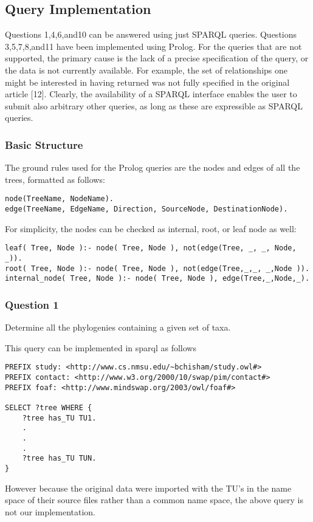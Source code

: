 \documentclass[10pt]{article}
\begin{document}
\subsection{Query Implementation}
Questions 1,4,6,and10 can be answered using just SPARQL queries.  Questions
3,5,7,8,and11 have been implemented using Prolog.   For the queries that are
not supported, the primary cause is the lack of a precise specification of the
query, or the data is not currently available. For example, the set of
relationships one might be interested in having returned was not fully
specified in the original article [12].  Clearly, the availability of a SPARQL
interface enables the user to submit also arbitrary other queries, as long as
these are expressible as SPARQL queries.
\subsubsection{Basic Structure}

The ground rules used for the Prolog queries are the nodes and edges of all the trees, formatted as follows:
\begin{verbatim}
node(TreeName, NodeName).
edge(TreeName, EdgeName, Direction, SourceNode, DestinationNode).
\end{verbatim}

For simplicity, the nodes can be checked as internal, root, or leaf node as well:
\begin{verbatim}
leaf( Tree, Node ):- node( Tree, Node ), not(edge(Tree, _, _, Node, _)).
root( Tree, Node ):- node( Tree, Node ), not(edge(Tree,_,_, _,Node )).
internal_node( Tree, Node ):- node( Tree, Node ), edge(Tree,_,Node,_).
\end{verbatim}

\subsubsection{Question 1}
 Determine all the phylogenies containing a given set of taxa.

This query can be implemented in sparql as follows
\begin{verbatim}
PREFIX study: <http://www.cs.nmsu.edu/~bchisham/study.owl#>
PREFIX contact: <http://www.w3.org/2000/10/swap/pim/contact#>
PREFIX foaf: <http://www.mindswap.org/2003/owl/foaf#>

SELECT ?tree WHERE {
    ?tree has_TU TU1.
    .
    .
    .
    ?tree has_TU TUN.
}
\end{verbatim}
However because the original data were imported with the TU's in the name space
of their source files rather than a common name space, the above query is not
our implementation.
\end{document}
